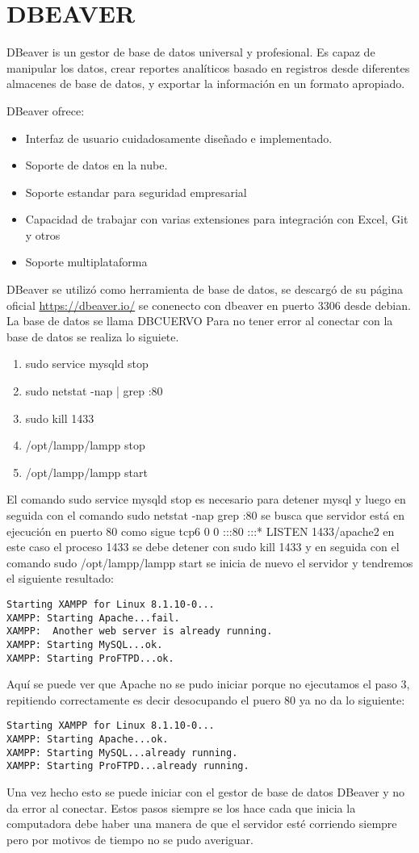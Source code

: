 \chapter*{DBEAVER}
DBeaver is un gestor de base de datos universal y profesional. Es capaz de manipular los datos, crear reportes analíticos basado en registros desde diferentes almacenes de base de datos, y exportar la información en un formato apropiado. 

DBeaver ofrece:
\begin{itemize}
\item Interfaz de usuario cuidadosamente diseñado e implementado.
\item Soporte de datos en la nube.
\item Soporte estandar para seguridad empresarial
\item Capacidad de trabajar con varias extensiones para integración con Excel, Git y otros
\item Soporte multiplataforma
\end{itemize}

DBeaver se utilizó como herramienta de base de datos, se descargó de su página oficial \url{https://dbeaver.io/}
se conenecto con dbeaver en puerto 3306 desde debian. La base de datos se llama DBCUERVO
Para no tener error al conectar con la base de datos se realiza lo siguiete. 
\begin{enumerate}
\item sudo service mysqld stop
\item sudo netstat -nap | grep :80 
\item sudo kill 1433
\item /opt/lampp/lampp stop
\item /opt/lampp/lampp start
\end{enumerate}
El comando sudo service mysqld stop es necesario para detener mysql y luego en seguida con el comando  sudo netstat -nap  grep :80 se busca que servidor está en ejecución en puerto 80 como sigue tcp6       0      0 :::80                   :::*                    LISTEN      1433/apache2    en este caso el proceso 1433 se debe detener con sudo kill 1433
y en seguida con el comando sudo /opt/lampp/lampp start se inicia de nuevo el servidor y tendremos el siguiente resultado:
\begin{verbatim}
Starting XAMPP for Linux 8.1.10-0...
XAMPP: Starting Apache...fail.
XAMPP:  Another web server is already running.
XAMPP: Starting MySQL...ok.
XAMPP: Starting ProFTPD...ok.
\end{verbatim}
Aquí se puede ver que Apache no se pudo iniciar porque no ejecutamos el paso 3, repitiendo correctamente es decir desocupando el puero 80 ya no da lo siguiente:
\begin{verbatim}
Starting XAMPP for Linux 8.1.10-0...
XAMPP: Starting Apache...ok.
XAMPP: Starting MySQL...already running.
XAMPP: Starting ProFTPD...already running.
\end{verbatim}
Una vez hecho esto se puede iniciar con el gestor de base de datos DBeaver y no da error al conectar. Estos pasos siempre se los hace cada que inicia la computadora debe haber una manera de que el servidor esté corriendo siempre pero por motivos de tiempo no se pudo averiguar. 